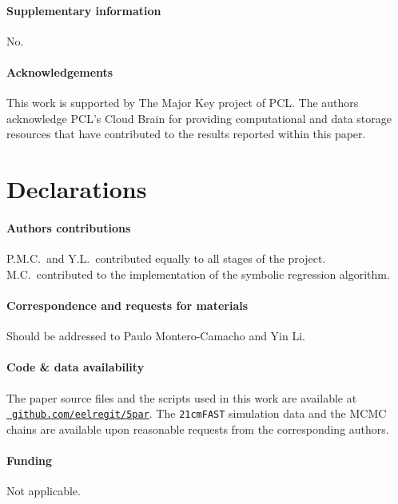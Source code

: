 \paragraph{\large Supplementary information} No.

\paragraph{\large Acknowledgements}
This work is supported by The Major Key project of PCL.
The authors acknowledge PCL's Cloud Brain for providing computational
and data storage resources that have contributed to the results reported
within this paper.

\section*{Declarations}

\paragraph{\large Authors contributions}
P.M.C.\ and Y.L.\ contributed equally to all stages of the project.
M.C.\ contributed to the implementation of the symbolic regression
algorithm.

\vspace{-1em}
\paragraph{\large Correspondence and requests for materials}
Should be addressed to Paulo Montero-Camacho and Yin Li.

\vspace{-1em}
\paragraph{\large Code \& data availability}
The paper source files and the scripts used in this work are available
at \href{https://github.com/eelregit/5par}{\faGithub\
\texttt{github.com/eelregit/5par}}.
The \texttt{21cmFAST} simulation data and the MCMC chains are available
upon reasonable requests from the corresponding authors.

\vspace{-1em}
\paragraph{\large Funding}
Not applicable.

\vspace{-1em}
